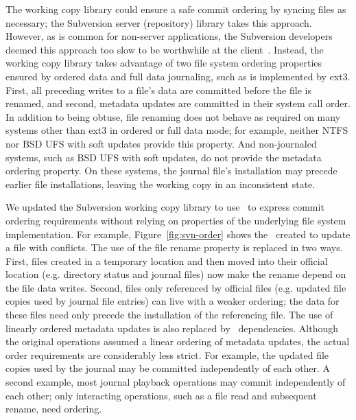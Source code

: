 The working copy library could ensure a safe commit ordering by
syncing files as necessary; the Subversion server (repository) library
takes this approach.
%
However, as is common for non-server applications, the Subversion
developers deemed this approach too slow to be worthwhile at the
client~\cite{svntradeoff}.
%
Instead, the working copy library takes advantage of two file system
ordering properties ensured by ordered data and full data journaling, such
as is implemented by ext3.
%
First, all preceding writes to a file's data are committed before the file
is renamed,
%
and second, metadata updates are committed in their system call order.
%
%
In addition to being obtuse, file renaming does not behave
as required on many systems other than ext3 in ordered or full data
mode; for example, neither NTFS nor BSD UFS with soft updates provide
this property.
%
And non-journaled systems, such as BSD UFS with soft updates, do not
provide the metadata ordering property. On these systems, the journal
file's installation may precede earlier file installations, leaving the
working copy in an inconsistent state.

We updated the Subversion working copy library to use \patchgroups\ to
express commit ordering requirements
without relying on properties of the
underlying file system implementation.
%
For example, Figure~\ref{fig:svn-order} shows the \patchgroups\ created to update a
file with conflicts.
%
The use of the file rename property is replaced in two ways.
%
First, files created in a temporary location and then moved into their
official location (e.g. directory status and journal files) now
make the rename depend on the file data writes.
%
Second, files only referenced by official files (e.g. updated file
copies used by journal file entries) can live with a weaker ordering;
the data for these files need only precede the installation of the
referencing file.
%
The use of linearly ordered metadata updates is also replaced by
\patchgroup\ dependencies.
%
Although the original operations assumed a linear ordering of metadata
updates, the actual order requirements are considerably less strict.
%
For example, the updated file copies used by the journal may be
committed independently of each other.
%
A second example, most journal playback operations may commit
independently of each other; only interacting operations, such as a
file read and subsequent rename, need ordering.

